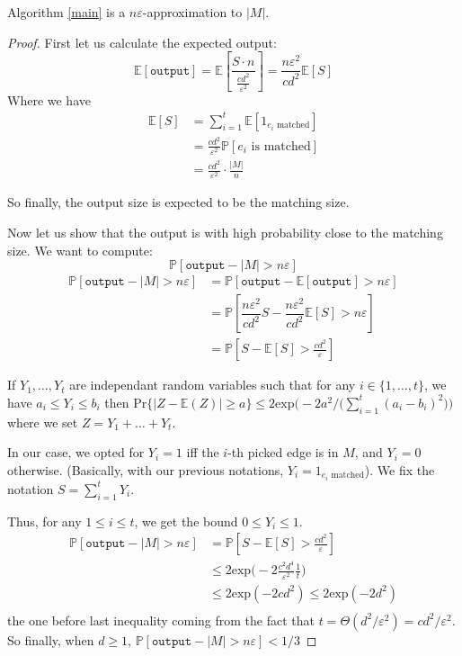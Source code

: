 \begin{theorem}
Algorithm \ref{main} is a $n \varepsilon$-approximation to $|M|$.
\end{theorem}
\begin{proof}
First let us calculate the expected output:
\[
\mathbb{E}[\texttt{output}] = \mathbb{E}\left [\dfrac{S \cdot n}{\frac{cd^2}{\varepsilon^2}} \right ]
=\dfrac{n\varepsilon^2}{cd^2}\mathbb{E}[S]
\]
Where we have
\begin{align*}
\mathbb{E}[S]&= \sum_{i=1}^t \mathbb{E}[1_{e_i\text{ matched}}] \\
	&= \frac{cd^2}{\varepsilon^2} \mathbb{P}[e_i\text{ is matched}] \\
	&=\frac{cd^2}{\varepsilon^2} \cdot \frac{|M|}{n}
\end{align*}

So finally, the output size is expected to be the matching size.

Now let us show that the output is with high probability close to the matching size.
We want to compute:
\[
\mathbb{P}[\texttt{output} - |M| > n\varepsilon]
\]
\begin{align*}
\mathbb{P}[\texttt{output} - |M| > n\varepsilon] &= \mathbb{P}[\texttt{output} - \mathbb{E}[\texttt{output}] > n\varepsilon]\\
	&=\mathbb{P}[\dfrac{n\varepsilon^2}{cd^2}S - \dfrac{n\varepsilon^2}{cd^2}\mathbb{E}[S] 
> n\varepsilon]\\
	&=\mathbb{P}[S - \mathbb{E}[S] >  \frac{cd^2}{\varepsilon}]
\end{align*}


\begin{lemma} If $Y_1,\dots,Y_t$ are independant random variables such that for any $i \in\{1,\dots,t\}$, we have $a_i \leq Y_i \leq b_i$ then $\mathrm{Pr}\{|Z - \mathbb{E}(Z)| \geq a \} \leq 2 \mathrm{exp}\Big(-2a^2/\big(\sum_{i=1}^t(a_i-b_i)^2\big)\Big)$ where we set $Z = Y_1+\dots+Y_t$.
\end{lemma}

In our case, we opted for $Y_i=1$ iff the $i$-th picked edge is in $M$, 
and $Y_i = 0$ otherwise. (Basically, with our previous notations, $Y_i=1_{e_i\text{ matched}}$).
We fix the notation $S = \sum_{i=1}^t Y_i$. 

Thus, for any $1 \leq i \leq t$, we get the bound $0 \leq Y_i \leq 1$.
\begin{align*}
\mathbb{P}[\texttt{output} - |M| > n\varepsilon] &= \mathbb{P}[S - \mathbb{E}[S] >  \frac{cd^2}{\varepsilon}]\\
	&\leq 2 \mathrm{exp}\Big(-2 \frac{c^2d^4}{\varepsilon^2}\frac{1}{t}\Big) \\
	&\leq 2 \mathrm{exp}(-2 cd^2) \leq 2 \mathrm{exp}(-2 d^2)\\
\end{align*}
the one before last inequality coming from the fact that $t = \Theta(d^2/\varepsilon^2) = cd^2/\varepsilon^2$.\\
So finally, when $d \geq 1$, $\mathbb{P}[\texttt{output} - |M| > n\varepsilon]<1/3$

\end{proof}

